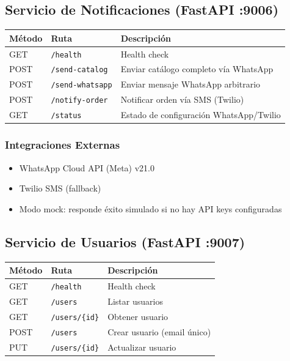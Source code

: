 \documentclass[11pt,a4paper]{article}
\begin{document}
\subsection{Servicio de Notificaciones (FastAPI :9006)}

\begin{tabularx}{\textwidth}{|l|X|l|}
\hline
\textbf{Método} & \textbf{Ruta} & \textbf{Descripción} \\
\hline
GET & \texttt{/health} & Health check \\
POST & \texttt{/send-catalog} & Enviar catálogo completo vía WhatsApp \\
POST & \texttt{/send-whatsapp} & Enviar mensaje WhatsApp arbitrario \\
POST & \texttt{/notify-order} & Notificar orden vía SMS (Twilio) \\
GET & \texttt{/status} & Estado de configuración WhatsApp/Twilio \\
\hline
\end{tabularx}

\subsubsection{Integraciones Externas}
\begin{itemize}
    \item WhatsApp Cloud API (Meta) v21.0
    \item Twilio SMS (fallback)
    \item Modo mock: responde éxito simulado si no hay API keys configuradas
\end{itemize}

\subsection{Servicio de Usuarios (FastAPI :9007)}

\begin{tabularx}{\textwidth}{|l|X|l|}
\hline
\textbf{Método} & \textbf{Ruta} & \textbf{Descripción} \\
\hline
GET & \texttt{/health} & Health check \\
GET & \texttt{/users} & Listar usuarios \\
GET & \texttt{/users/\{id\}} & Obtener usuario \\
POST & \texttt{/users} & Crear usuario (email único) \\
PUT & \texttt{/users/\{id\}} & Actualizar usuario \\
\hline
\end{tabularx}
\end{document}
